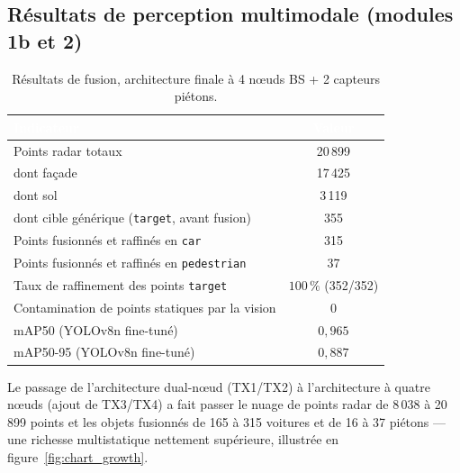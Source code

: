 \documentclass[12pt,a4paper,titlepage]{article}
\newcommand{\hd}[1]{\textcolor{white}{\textbf{#1}}}
\begin{document}
\subsection{Résultats de perception multimodale (modules 1b et 2)}
\label{subsec:res_phase3}

\begin{table}[H]
    \centering
    \caption{Résultats de fusion, architecture finale à 4 n\oe uds BS + 2 capteurs piétons.}
    \begin{tabular}{lc}
        \toprule
        \rowcolor{tabhead}
        \hd{Indicateur} & \hd{Valeur} \\
        \midrule
        Points radar totaux & 20\,899 \\
        \quad dont façade & 17\,425 \\
        \quad dont sol & 3\,119 \\
        \quad dont cible générique (\texttt{target}, avant fusion) & 355 \\
        Points fusionnés et raffinés en \texttt{car} & 315 \\
        Points fusionnés et raffinés en \texttt{pedestrian} & 37 \\
        Taux de raffinement des points \texttt{target} & $100\,\%$ (352/352) \\
        Contamination de points statiques par la vision & $0$ \\
        mAP50 (YOLOv8n fine-tuné) & $0{,}965$ \\
        mAP50-95 (YOLOv8n fine-tuné) & $0{,}887$ \\
        \bottomrule
    \end{tabular}
\end{table}

Le passage de l'architecture dual-n\oe ud (TX1/TX2) à l'architecture à quatre n\oe uds (ajout de TX3/TX4) a fait passer le nuage de points radar de 8\,038 à 20\,899 points et les objets fusionnés de 165 à 315 voitures et de 16 à 37 piétons --- une richesse multistatique nettement supérieure, illustrée en figure~\ref{fig:chart_growth}.
\end{document}
